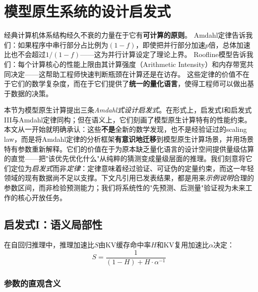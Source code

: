 \section{模型原生系统的设计启发式}
\label{sec:laws}

经典计算机体系结构经久不衰的力量在于它有\textbf{可计算的原则}。
Amdahl定律告诉我们：如果程序中串行部分占比例为$(1-f)$，即使把并行部分加速$p$倍，总体加速比也不会超过$1/(1-f)$——这为并行计算设定了理论上界\cite{hennessy2017quantitative}。
Roofline模型告诉我们：每个计算核心的性能上限由其计算强度（Arithmetic Intensity）和内存带宽共同决定——这帮助工程师快速判断瓶颈在计算还是在访存\cite{hennessy2017quantitative}。
这些定律的价值不在于它们的数学复杂度，而在于它们提供了\textbf{统一的量化语言}，使得工程师可以做出基于数据的决策。

本节为模型原生计算提出三条\emph{Amdahl式设计启发式}。在形式上，启发式I和启发式III与Amdahl定律同构；但在语义上，它们刻画了模型原生计算特有的性能约束。本文从一开始就明确承认：这些\textbf{不是}全新的数学发现，也不是经验证过的scaling law，而是将Amdahl定律的分析框架\textbf{有意识地迁移}到模型原生计算场景，并用场景特有参数重新解释。它们的价值在于为原本缺乏量化语言的设计空间提供量级估算的直觉——把"该优先优化什么"从纯粹的猜测变成量级层面的推理。我们刻意将它们定位为\emph{启发式}而非\emph{定律}：定律意味着经过验证、可证伪的定量约束，而这一年轻领域的现有数据尚不足以支撑。下文凡引用已发表结果，都是用来\emph{示例说明}合理的参数区间，而非检验预测能力；我们将系统性的"先预测、后测量"验证视为未来工作的核心开放任务。

\subsection{启发式I：语义局部性}
\label{sec:law1}

\begin{heuristic}[语义局部性]
在自回归推理中，推理加速比$S$由KV缓存命中率$H$和KV复用加速比$\alpha$决定：
\begin{equation}
\label{eq:locality}
S = \frac{1}{(1-H) + H \cdot \alpha^{-1}}
\end{equation}
\end{heuristic}

\subsubsection{参数的直观含义}

